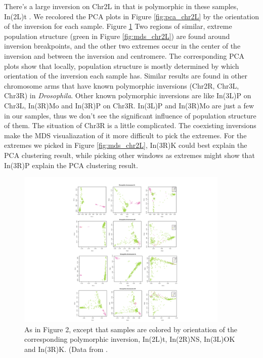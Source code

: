 \documentclass[11pt, oneside]{article}   	%
\begin{document}
There's a large inversion on Chr2L in that is polymorphic in these samples, In(2L)t \citep{corbett2012population}. We recolored the PCA plots in Figure \ref{fig:pca_chr2L} by the orientation of the inversion for each sample. Figure \ref{fig:color_inver}
Two regions of similar, extreme population structure (green in Figure \ref{fig:mds_chr2L}) are found around inversion breakpoints, 
and the other two extremes occur in the center of the inversion and between the inversion and centromere.
The corresponding PCA plots show that locally, population structure is mostly determined by which orientation of the inversion each sample has.
Similar results are found in other chromosome arms that have known polymorphic inversions (Chr2R, Chr3L, Chr3R) in \textit{Drosophila}. 
Other known polymorphic inversions are like In(3L)P on Chr3L, In(3R)Mo and  In(3R)P on Chr3R. 
In(3L)P and In(3R)Mo are just a few in our samples, thus we don't see the significant influence of population structure of them. 
The situation of Chr3R is a little complicated. The coexisting inversions make the MDS visualiazation of it more difficult to pick the extremes.
For the extremes we picked in Figure \ref{fig:mds_chr2L}, In(3R)K could best explain the PCA clustering result, 
while picking other windows as extremes might show that In(3R)P explain the PCA clustering result.

\begin{figure}
    \begin{center}
       \includegraphics[width=0.9\textwidth]{Fig3}
    \end{center}
    \caption{
         As in Figure 2, except that samples are colored by orientation of the corresponding polymorphic inversion, In(2L)t, In(2R)NS, In(3L)OK and In(3R)K. (Data from \citet{lack2015drosophila}.
        \label{fig:color_inver}
    }
\end{figure}
\end{document}
